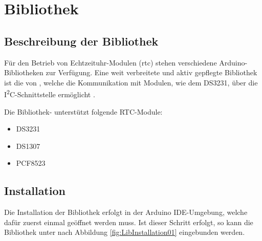 









\section{Bibliothek }
\label{sec:bib_rtclib}

\subsection{Beschreibung der Bibliothek}

Für den Betrieb von Echtzeituhr-Modulen (\ac{rtc}) stehen verschiedene Arduino-Bibliotheken zur Verfügung. 
Eine weit verbreitete und aktiv gepflegte Bibliothek ist die  von , 
welche die Kommunikation mit Modulen, wie dem DS3231, über die I\textsuperscript{2}C-Schnittstelle ermöglicht \cite{Adafruit:2023}.

Die Bibliothek- unterstützt folgende RTC-Module:

\begin{itemize}
	\item DS3231
	\item DS1307
	\item PCF8523
\end{itemize}


\subsection{Installation}

Die Installation der Bibliothek erfolgt in der Arduino IDE-Umgebung, welche dafür zuerst einmal geöffnet werden muss. Ist dieser Schritt erfolgt, so kann die Bibliothek unter  nach Abbildung \ref{fig:LibInstallation01} eingebunden werden.

